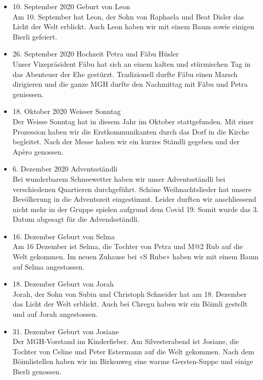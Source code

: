 \begin{history}
\begin{itemize}
        \item 10. September 2020 Geburt von Leon\\
              Am 10. September hat Leon, der Sohn von Raphaela und Beat Disler
              das Licht der Welt erblickt. Auch Leon haben wir mit einem Baum
              sowie einigen Bierli gefeiert.

        \item 26. September 2020 Hochzeit Petra und Fäbu Hüsler\\
              Unser Vizepräsident Fäbu hat sich an einem kalten und stürmischen
              Tag in das Abenteuer der Ehe gestürzt. Tradizionell durfte Fäbu
              einen Marsch dirigieren und die ganze MGH durfte den Nachmittag
              mit Fäbu und Petra geniessen.

        \item 18. Oktober 2020 Weisser Sonntag\\
              Der Weisse Sonntag hat in diesem Jahr im Oktober stattgefunden.
              Mit einer Prozession haben wir die Erstkommunikanten durch das
              Dorf in die Kirche begleitet. Nach der Messe haben wir ein kurzes
              Ständli gegeben und der Apèro genossen.

        \item 6. Dezember 2020 Adventsständli\\
              Bei wunderbarem Schneewetter haben wir unser Adventsständli bei
              verschiedenen Quartieren durchgeführt. Schöne Weihnachtslieder hat
              unsere Bevölkerung in die Adventszeit eingestimmt. Leider durften
              wir anschliessend nicht mehr in der Gruppe spielen aufgrund dem
              Covid 19. Somit wurde das 3. Datum abgesagt für die
              Advendsständli.

        \item 16. Dezember Geburt von Selma\\
              Am 16 Dezember ist Selma, die Tochter von Petra und M@2 Rub auf
              die Welt gekommen. Im neuen Zuhause bei «S Rube» haben wir mit
              einem Baum auf Selma angestossen.

        \item 18. Dezember Geburt von Jorah\\
              Jorah, der Sohn von Subin und Christoph Schneider hat am 18.
              Dezember das Licht der Welt erblickt. Auch bei Chregu haben wir
              ein Böimli gestellt und auf Jorah angestossen.

        \item 31. Dezember Geburt von Josiane\\
              Der MGH-Vorstand im Kinderfieber. Am Silvesterabend ist Josiane,
              die Tochter von Celine und Peter Estermann auf die Welt gekommen.
              Nach dem Böimlistellen haben wir im Birkenweg eine warme
              Gersten-Suppe und einige Bierli genossen.


    \end{itemize}

\end{history}
